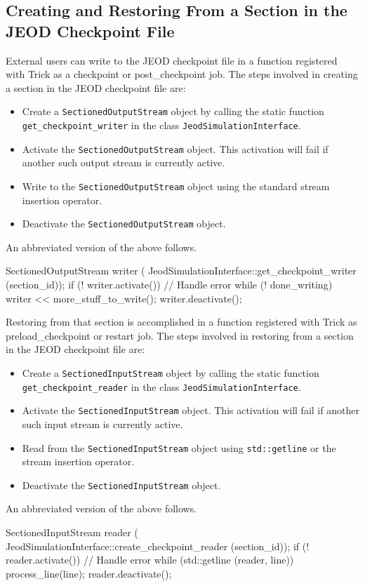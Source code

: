 \subsection{Creating and Restoring From a Section in the JEOD Checkpoint File}
External users can write to the JEOD checkpoint file in a function
registered with Trick as a checkpoint or post\_checkpoint job.
The steps involved in creating a section in
the JEOD checkpoint file are:
\begin{itemize}
\item Create a \verb|SectionedOutputStream| object
by calling the static function \verb|get_checkpoint_writer|
in the class \verb|JeodSimulationInterface|.
\item Activate the \verb|SectionedOutputStream| object.
This activation will fail if another such output stream
is currently active.
\item Write to the \verb|SectionedOutputStream| object using
the standard \Cplusplus stream insertion operator.
\item Deactivate the \verb|SectionedOutputStream| object.
\end{itemize}
An abbreviated version of the above follows.
\begin{codeblock}
SectionedOutputStream writer (
   JeodSimulationInterface::get_checkpoint_writer (section_id));
if (! writer.activate()) {
   // Handle error
}
while (! done_writing) {
   writer << more_stuff_to_write();
}
writer.deactivate();
\end{codeblock}

Restoring from that section is accomplished in a function registered
with Trick as preload\_checkpoint or restart job.
The steps involved in restoring from a section in
the JEOD checkpoint file are:
\begin{itemize}
\item Create a \verb|SectionedInputStream| object
by calling the static function \verb|get_checkpoint_reader|
in the class \verb|JeodSimulationInterface|.
\item Activate the \verb|SectionedInputStream| object.
This activation will fail if another such input stream
is currently active.
\item Read from the \verb|SectionedInputStream| object using
\verb|std::getline| or
the \Cplusplus stream insertion operator.
\item Deactivate the \verb|SectionedInputStream| object.
\end{itemize}
An abbreviated version of the above follows.
\begin{codeblock}
SectionedInputStream reader (
   JeodSimulationInterface::create_checkpoint_reader (section_id));
if (! reader.activate()) {
   // Handle error
}
while (std::getline (reader, line)) {
   process_line(line);
}
reader.deactivate();
\end{codeblock}

